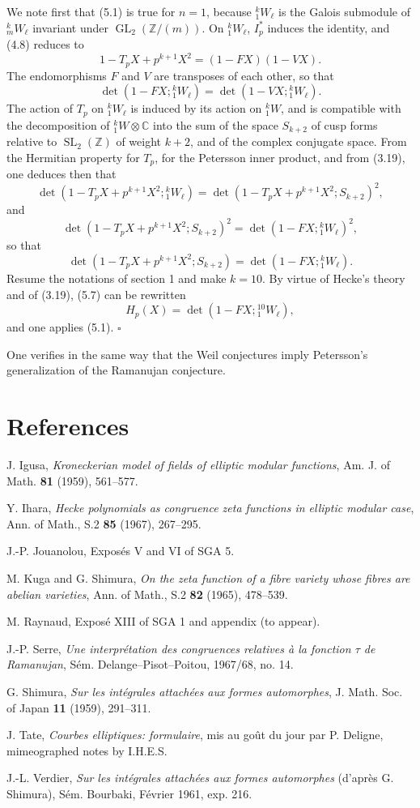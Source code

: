 \documentclass[10pt]{article}
\newcommand{\C}{\mathbb C}
\newcommand{\Z}{\mathbb Z}
\newcommand{\GL}{\operatorname{GL}}
\newcommand{\SL}{\operatorname{SL}}
\newcommand{\QED}{\hfill$\square$}
\begin{document}
We note first that (5.1) is true for $n=1$, because ${}^k_1W_\ell$ is the Galois submodule of ${}^k_mW_\ell$ invariant under $\GL_2(\Z/(m))$. On ${}^k_1W_\ell$, $I_p^*$ induces the identity, and (4.8) reduces to
\[
1-T_pX+p^{k+1}X^2=(1-FX)(1-VX).
\]
The endomorphisms $F$ and $V$ are transposes of each other, so that
\[
\det(1-FX;{}^k_1W_\ell)=\det(1-VX;{}^k_1W_\ell).
\]
The action of $T_p$ on ${}^k_1W_\ell$ is induced by its action on ${}^k_1W$, and is compatible with the decomposition of ${}^k_1W\otimes\C$ into the sum of the space $S_{k+2}$ of cusp forms relative to $\SL_2(\Z)$ of weight $k+2$, and of the complex conjugate space. From the Hermitian property for $T_p$, for the Petersson inner product, and from (3.19), one deduces then that
\[
\det(1-T_pX+p^{k+1}X^2;{}^k_1W_\ell)=\det(1-T_pX+p^{k+1}X^2;S_{k+2})^2,
\]
and
\[
\det(1-T_pX+p^{k+1}X^2;S_{k+2})^2=\det(1-FX;{}^k_1W_\ell)^2,
\]
so that
\[
\det(1-T_pX+p^{k+1}X^2;S_{k+2})=\det(1-FX;{}^k_1W_\ell).
\tag{5.7}
\]
Resume the notations of section 1 and make $k=10$. By virtue of Hecke's theory and of (3.19), (5.7) can be rewritten
\[
H_p(X)=\det(1-FX;{}^{10}_1W_\ell),
\]
and one applies (5.1). \QED

One verifies in the same way that the Weil conjectures imply Petersson's generalization of the Ramanujan conjecture.

\section*{References}
\begin{enumerate}[label={[\arabic*]},leftmargin=2.6em]
\item J. Igusa, \emph{Kroneckerian model of fields of elliptic modular functions}, Am. J. of Math. \textbf{81} (1959), 561--577.
\item Y. Ihara, \emph{Hecke polynomials as congruence zeta functions in elliptic modular case}, Ann. of Math., S.2 \textbf{85} (1967), 267--295.
\item J.-P. Jouanolou, Exposés V and VI of SGA 5.
\item M. Kuga and G. Shimura, \emph{On the zeta function of a fibre variety whose fibres are abelian varieties}, Ann. of Math., S.2 \textbf{82} (1965), 478--539.
\item M. Raynaud, Exposé XIII of SGA 1 and appendix (to appear).
\item J.-P. Serre, \emph{Une interprétation des congruences relatives à la fonction $\tau$ de Ramanujan}, Sém. Delange--Pisot--Poitou, 1967/68, no. 14.
\item G. Shimura, \emph{Sur les intégrales attachées aux formes automorphes}, J. Math. Soc. of Japan \textbf{11} (1959), 291--311.
\item J. Tate, \emph{Courbes elliptiques: formulaire}, mis au goût du jour par P. Deligne, mimeographed notes by I.H.E.S.
\item J.-L. Verdier, \emph{Sur les intégrales attachées aux formes automorphes} (d'après G. Shimura), Sém. Bourbaki, Février 1961, exp. 216.
\end{enumerate}
\end{document}
